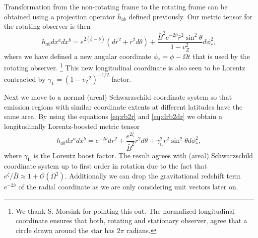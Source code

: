 \documentclass[iop, usenatbib]{emulateapj}
\newcommand{\be}{\begin{equation}}
\newcommand{\ee}{\end{equation}}
\newcommand{\sch}{Schwarzschild }
\newcommand{\rb}{\ensuremath{\bar{r}}}
\newcommand{\nub}{\ensuremath{\bar{\nu}}}
\newcommand{\zetab}{\ensuremath{\bar{\zeta}}}
\newcommand{\Bb}{\ensuremath{\bar{B}}}
\newcommand{\vz}{\ensuremath{v_{\mathrm{Z}}}}
\newcommand{\lgamma}{\gamma_{\text{L}}}
\begin{document}
Transformation from the non-rotating frame to the rotating frame can be obtained using a projection operator $\bar{h}_{ab}$ defined previously.
Our metric tensor for the rotating observer is then
\be
\bar{h}_{ab} dx^a dx^b = e^{2(\zetab - \nub)} (d\rb^2 + \rb^2 d\theta) + \frac{\Bb^2 e^{-2\nub} \rb^2 \sin^2\theta}{1-v_Z^2} d\phi_*^2,
\ee
where we have defined a new angular coordinate $\phi_* = \phi - \Omega t$ that is used by the rotating observer.%
\footnote{We thank S. Morsink for pointing this out. 
The normalized longitudinal coordinate ensures that both, rotating and stationary observer, agree that a circle drawn around the star has $2\pi$ radians.}
This new longitudinal coordinate is also seen to be Lorentz contracted by $\gamma_\mathrm{L} = (1-\vz^2)^{-1/2}$ factor.

Next we move to a normal (areal) \sch coordinate system so that emission
regions with similar coordinate extents at different latitudes have the
same area.
By using the equations \eqref{eq:rb2r} and
\eqref{eq:drb2dr} we obtain a longitudinally Lorentz-boosted metric
tensor 
\be \label{eq:gammaSch} 
h_{ab} dx^a dx^b = e^{-2\nub}dr^2 + \frac{e^{2\zetab}}{\Bb^2} r^2 d\theta + \lgamma^2 r^2 \sin^2\theta d\phi_*^2, 
\ee 
where $\gamma_\text{L}$ is the Lorentz boost factor.
The result agrees with (areal) \sch coordinate
system up to first order in rotation due to the fact that $e^{\zetab}/\Bb \approx 1 +
\mathcal{O}(\Omega^2)$.  Additionally we can drop the gravitational
redshift term $e^{-2\nub}$ of the radial coordinate as we are only
considering unit vectors later on.
\end{document}
